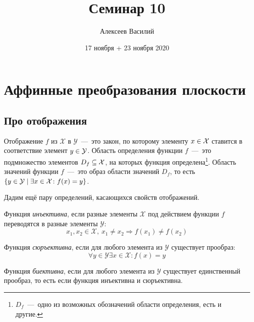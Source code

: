 \documentclass[a4paper,12pt]{article}
\author{Алексеев Василий}
\title{Семинар 10}
\date{17 ноября + 23 ноября 2020}
\begin{document}
  \maketitle
  
  \tableofcontents

  \thispagestyle{empty}
  
  \newpage
  


  \section{Аффинные преобразования плоскости}
  
  \subsection{Про отображения}
  
  Отображение $f$ из $\mathcal X$ в $\mathcal Y$~---~это закон, по которому элементу $x \hm\in \mathcal X$ ставится в соответствие элемент $y \hm\in \mathcal Y$.
  Область определения функции $f$~---~это подмножество элементов $D_f \hm\subseteq \mathcal X$, на которых функция определена\footnote{$D_f$~---~одно из возможных обозначений области определения, есть и другие.}.
  Область значений функции $f$~---~это образ области значений $D_f$, то есть $\{y \hm\in \mathcal Y \hm\mid \exists x \hm\in \mathcal X\colon f(x) \hm= y\}$.
  
  Дадим ещё пару определений, касающихся свойств отображений.
  
  \begin{definition}[Инъекция]
    Функция \emph{инъективна}, если разные элементы $\mathcal X$ под действием функции $f$ переводятся в разные элементы $\mathcal Y$:
    \[
      x_1, x_2 \in \mathcal X,\ x_1 \not= x_2 \Rightarrow f(x_1) \not= f(x_2)
    \]
  \end{definition}
  
  \begin{definition}[Сюръекция]
    Функция \emph{сюръективна}, если для любого элемента из $\mathcal Y$ существует прообраз:
    \[
      \forall y \in \mathcal Y \exists x \in \mathcal X\colon f(x) = y
    \]
  \end{definition}
  
  \begin{definition}[Биекция]
    Функция \emph{биективна}, если для любого элемента из $\mathcal Y$ существует единственный прообраз, то есть если функция инъективна и сюръективна.
  \end{definition}
  
\end{document}
